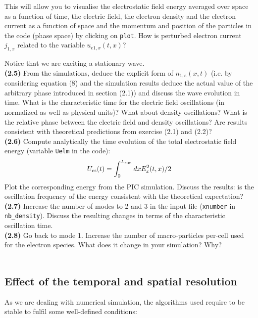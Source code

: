 \documentclass[11pt,a4paper]{article}
\begin{document}
This will allow you to visualise the electrostatic field energy averaged over space as a function of time,  the electric field, the electron density and the electron current as a function of space and the momentum and position of the particles in the code (phase space) by clicking on \texttt{plot}. How is perturbed electron current $j_{1,x}$ related to the variable $u_{e1,x}(t,x)$? 

Notice that we are exciting a stationary wave. \\

{\bf (2.5)} From the simulations, deduce the explicit form of $n_{1,e}(x,t)$ (i.e. by considering equation (8) and the simulation results deduce the actual value of the arbitrary  phase introduced in section (2.1)) and discuss the wave evolution in time. What is the characteristic time for the electric field oscillations (in normalized as well as physical units)? What about density oscillations? What is the relative phase between the electric field and density oscillations?  Are results consistent with theoretical predictions from exercise (2.1) and (2.2)?\\
{\bf (2.6)} Compute analytically the time evolution of the total electrostatic field energy (variable  \texttt{Uelm} in the code):
$$U_{\rm es}(t) = \int_{0}^{L_{\rm sim}} dx E_x^2(t,x)/2$$
Plot the corresponding energy from the PIC simulation. Discuss the results: is the oscillation frequency of the energy consistent with the theoretical expectation?\\
{\bf (2.7)} Increase the number of modes to 2 and 3 in the input file (\texttt{xnumber} in \texttt{nb\_density}). Discuss the resulting changes in terms of the characteristic oscillation time.\\
{\bf (2.8)} Go back to mode 1. Increase the number of macro-particles per-cell used for the electron species. What does it change in your simulation? Why?\\
 \\

\subsection*{Effect of the temporal and spatial resolution}

As we are dealing with numerical simulation, the algorithms used require to be stable to fulfil some well-defined conditions:\\
\end{document}
